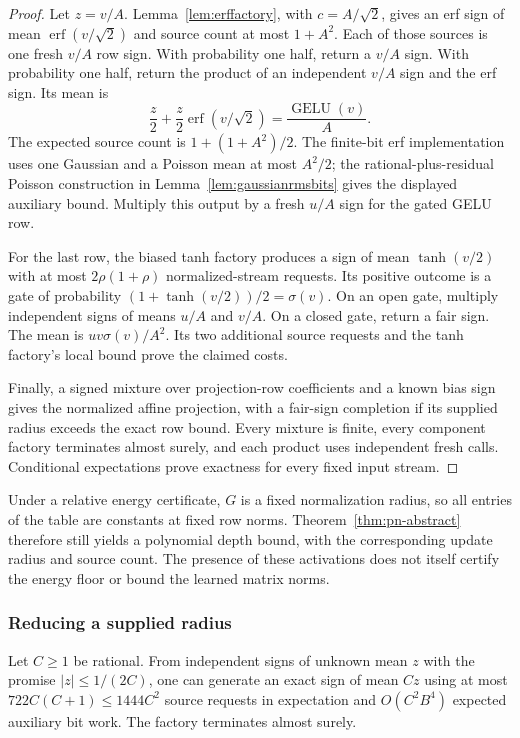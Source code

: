 \begin{proof}
Let $z=v/A$. Lemma~\ref{lem:erffactory}, with $c=A/\sqrt2$, gives
an erf sign of mean $\operatorname{erf}(v/\sqrt2)$ and source count
at most $1+A^2$. Each of those sources is one fresh $v/A$ row sign.
With probability one half, return a $v/A$ sign. With probability
one half, return the product of an independent $v/A$ sign and the
erf sign. Its mean is
\[
 \frac z2+\frac z2\operatorname{erf}(v/\sqrt2)
 =\frac{\operatorname{GELU}(v)}A.
\]
The expected source count is $1+(1+A^2)/2$. The finite-bit erf
implementation uses one Gaussian and a Poisson mean at most $A^2/2$;
the rational-plus-residual Poisson construction in
Lemma~\ref{lem:gaussianrmsbits} gives the displayed auxiliary bound.
Multiply this output by a fresh $u/A$ sign for the gated GELU row.

For the last row, the biased tanh factory produces a sign of mean
$\tanh(v/2)$ with at most $2\rho(1+\rho)$ normalized-stream requests.
Its positive outcome is a gate of probability
$(1+\tanh(v/2))/2=\sigma(v)$. On an open gate, multiply independent
signs of means $u/A$ and $v/A$. On a closed gate, return a fair sign.
The mean is $uv\sigma(v)/A^2$. Its two additional source requests
and the tanh factory's local bound prove the claimed costs.

Finally, a signed mixture over projection-row coefficients and a known
bias sign gives the normalized affine projection, with a fair-sign
completion if its supplied radius exceeds the exact row bound.
Every mixture is finite, every component factory terminates almost
surely, and each product uses independent fresh calls. Conditional
expectations prove exactness for every fixed input stream.
\end{proof}

Under a relative energy certificate, $G$ is a fixed normalization
radius, so all entries of the table are constants at fixed row norms.
Theorem~\ref{thm:pn-abstract} therefore still yields a polynomial depth
bound, with the corresponding update radius and source count. The
presence of these activations does not itself certify the energy floor
or bound the learned matrix norms.

\subsubsection{Reducing a supplied radius}

\begin{lemma}
\label{lem:bipolar-amplification}
Let $C\ge1$ be rational. From independent signs of unknown mean $z$
with the promise $|z|\le1/(2C)$, one can generate an exact sign of
mean $Cz$ using at most $722C(C+1)\le1444C^2$ source requests in
expectation and $O(C^2B^4)$ expected auxiliary bit work. The factory
terminates almost surely.
\end{lemma}
